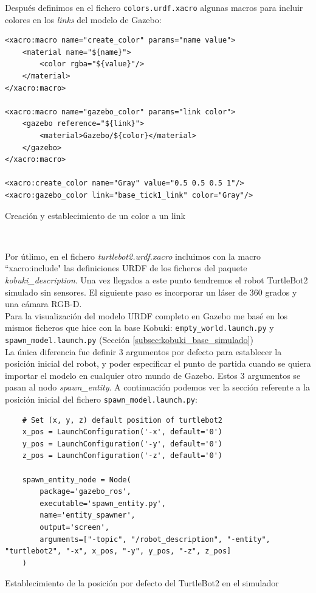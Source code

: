 Después definimos en el fichero \texttt{colors.urdf.xacro} algunas macros para incluir colores en los \textit{links} del modelo de Gazebo:\\
\begin{code}[H]
\begin{lstlisting}
<xacro:macro name="create_color" params="name value">
	<material name="${name}">
		<color rgba="${value}"/>
	</material>
</xacro:macro>

<xacro:macro name="gazebo_color" params="link color">
	<gazebo reference="${link}">
		<material>Gazebo/${color}</material>
	</gazebo>
</xacro:macro>

<xacro:create_color name="Gray" value="0.5 0.5 0.5 1"/>
<xacro:gazebo_color link="base_tick1_link" color="Gray"/>
\end{lstlisting}
\caption{Creación y establecimiento de un color a un link}
\label{fig:creacion_color_link}
\end{code}\

Por útlimo, en el fichero \textit{turtlebot2.urdf.xacro} incluimos con la macro ``xacro:include" las definiciones URDF de los ficheros del paquete \textit{kobuki\_description}. Una vez llegados a este punto tendremos el robot TurtleBot2 simulado sin sensores. El siguiente paso es incorporar un láser de 360 grados y una cámara RGB-D.\\

Para la visualización del modelo URDF completo en Gazebo me basé en los mismos ficheros que hice con la base Kobuki: \texttt{empty\_world.launch.py} y \texttt{spawn\_model.launch.py} (Sección \ref{subsec:kobuki_base_simulado})\\

La única diferencia fue definir 3 argumentos por defecto para establecer la posición inicial del robot, y poder especificar el punto de partida cuando se quiera importar el modelo en cualquier otro mundo de Gazebo. Estos 3 argumentos se pasan al nodo \textit{spawn\_entity}. A continuación podemos ver la sección referente a la posición inicial del fichero \texttt{spawn\_model.launch.py}:\\

\begin{code}[H]
\begin{lstlisting}
	# Set (x, y, z) default position of turtlebot2
	x_pos = LaunchConfiguration('-x', default='0')
	y_pos = LaunchConfiguration('-y', default='0')
	z_pos = LaunchConfiguration('-z', default='0')
	
	spawn_entity_node = Node(
		package='gazebo_ros',
		executable='spawn_entity.py',
		name='entity_spawner',
		output='screen',
		arguments=["-topic", "/robot_description", "-entity", "turtlebot2", "-x", x_pos, "-y", y_pos, "-z", z_pos]
	)
\end{lstlisting}
\caption{Establecimiento de la posición por defecto del TurtleBot2 en el simulador}
\label{cod:posicion_defecto_turtlebot2_simulador}
\end{code}\

